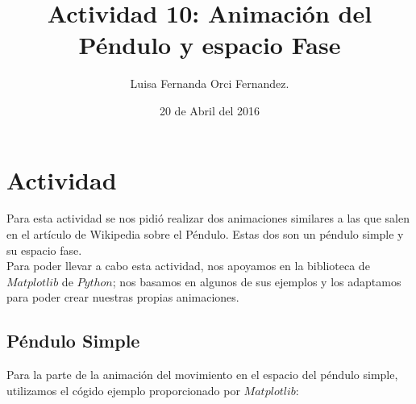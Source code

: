 \documentclass[12pt,letterpaper]{article}
\begin{document}
\title{Actividad 10: Animación del Péndulo y espacio Fase}
\author{Luisa Fernanda Orci Fernandez.}
\date{20 de Abril del 2016}

\maketitle

\section*{Actividad}

Para esta actividad se nos pidió realizar dos animaciones similares a las que salen en el artículo de Wikipedia sobre el Péndulo\cite{1}. Estas dos son un péndulo simple y su espacio fase. \\
Para poder llevar a cabo esta actividad, nos apoyamos en la biblioteca de $Matplotlib$ de $Python$; nos basamos en algunos de sus ejemplos y los adaptamos para poder crear nuestras propias animaciones. \\

\subsection*{Péndulo Simple}
Para la parte de la animación del movimiento en el espacio del péndulo simple, utilizamos el cógido ejemplo proporcionado por $Matplotlib$: 
\end{document}
